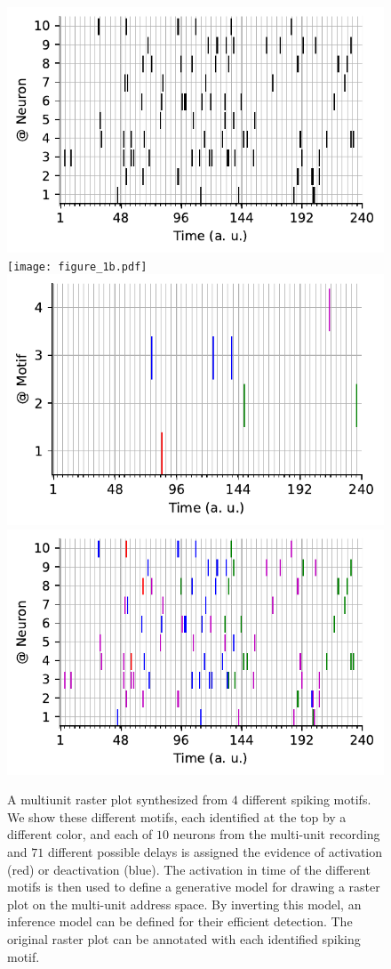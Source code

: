 \documentclass[11pt]{article}
\begin{document}
\begin{figure}[h!]%
    \includegraphics[width=.25\linewidth]{figure_1a_k.pdf}
    \texttt{[image: figure\_1b.pdf]}
  \includegraphics[width=.25\linewidth]{figure_1c.pdf}
    \includegraphics[width=.25\linewidth]{figure_1a.pdf}
{
\caption{A multiunit raster plot synthesized from $4$ different spiking motifs. We show these different motifs, each identified at the top by a different color, and each of $10$ neurons from the multi-unit recording and $71$ different possible delays is assigned the evidence of activation (red) or deactivation (blue). The activation in time of the different motifs is then used to define a generative model for drawing a raster plot on the multi-unit address space. By inverting this model, an inference model can be defined for their efficient detection. The original raster plot can be annotated with each identified spiking motif.
}
\label{fig:1}
}
\vspace{-5pt}
\end{figure}%
%
%
\end{document}

